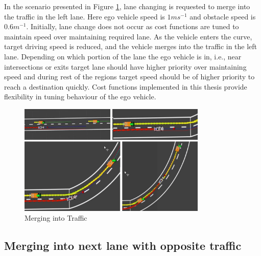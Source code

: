 In the scenario presented in Figure \ref{merging1}, lane changing is requested to merge into the traffic in the left lane. Here ego vehicle speed is $1ms^{-1}$ and obstacle speed is $0.6m^{-1}$. Initially, lane change does not occur as cost functions are tuned to maintain speed over maintaining required lane. As the vehicle enters the curve, target driving speed is reduced, and the vehicle merges into the traffic in the left lane. Depending on which portion of the lane the ego vehicle is in, i.e., near intersections or exits target lane should have higher priority over maintaining speed and during rest of the regions target speed should be of higher priority to reach a destination quickly. Cost functions implemented in this thesis provide flexibility in tuning behaviour of the ego vehicle. 

\begin{figure}
    \centering
    \includegraphics[width=0.8\textwidth]{Images/evaluation/merging1.jpg}
    \caption{Merging into Traffic}
    \label{merging1}
\end{figure}

\fi

\subsection{Merging into next lane with opposite traffic}

